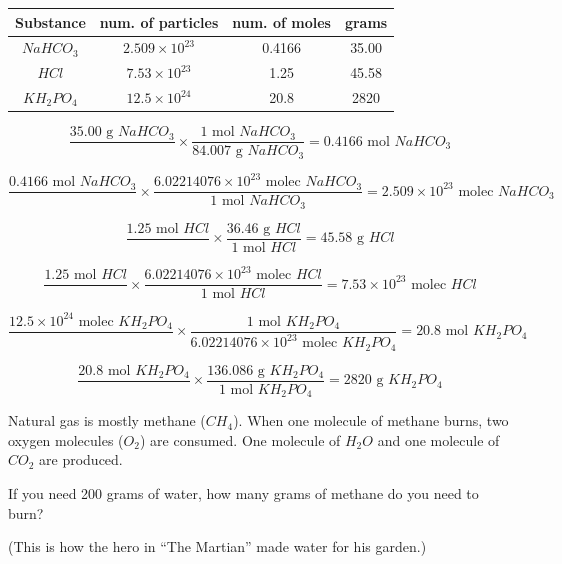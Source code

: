 \begin{Answer}[ref = convert]
\begin{tabular}{|c|c|c|c|}
\hline
Substance & num. of particles & num. of moles & grams \\\hline
$NaHCO_3$ & $2.509 \times 10^{23}$ & 0.4166 & 35.00 \\\hline
$HCl$ & $7.53 \times 10^{23}$ & 1.25 & 45.58 \\\hline
$KH_2PO_4$ & $12.5 \times 10^{24}$ & 20.8 & 2820 \\\hline
\end{tabular}

$$\frac{35.00\text{ g }NaHCO_3}{} \times 
\frac{1\text{ mol } NaHCO_3}{84.007\text{ g }NaHCO_3} = 0.4166\text{ mol }NaHCO_3$$

$$\frac{0.4166\text{ mol }NaHCO_3}{} \times \frac{6.02214076 
\times 10^{23}\text{ molec }NaHCO_3}{1\text{ mol }NaHCO_3} = 
2.509 \times 10^{23}\text{ molec }NaHCO_3$$

$$\frac{1.25\text{ mol }HCl}{} \times 
\frac{36.46\text{ g }HCl}{1\text{ mol }HCl} = 45.58\text{ g }HCl$$

$$\frac{1.25\text{ mol }HCl}{} \times 
\frac{6.02214076 \times 10^{23}\text{ molec }HCl}{1\text{ mol }HCl} 
= 7.53 \times 10^{23}\text{ molec }HCl$$

$$\frac{12.5 \times 10^{24}\text{ molec }KH_2PO_4}{} \times 
\frac{1\text{ mol }KH_2PO_4}{6.02214076 \times 10^{23}\text{ molec }KH_2PO_4} 
= 20.8\text{ mol }KH_2PO_4$$

$$\frac{20.8\text{ mol }KH_2PO_4}{} \times 
\frac{136.086\text{ g }KH_2PO_4}{1\text{ mol }KH_2PO_4} = 
2820\text{ g }KH_2PO_4$$
\end{Answer}


\begin{Exercise}[title={Burning Methane}, label=burning_methane]

Natural gas is mostly methane ($CH_4$). When one molecule of methane
burns, two oxygen molecules ($O_2$) are consumed. One molecule of
$H_2O$ and one molecule of $CO_2$ are produced.

If you need 200 grams of water, how many grams of methane do you need
to burn?

(This is how the hero in ``The Martian'' made water for his garden.)
\vspace{50mm}
\end{Exercise}

